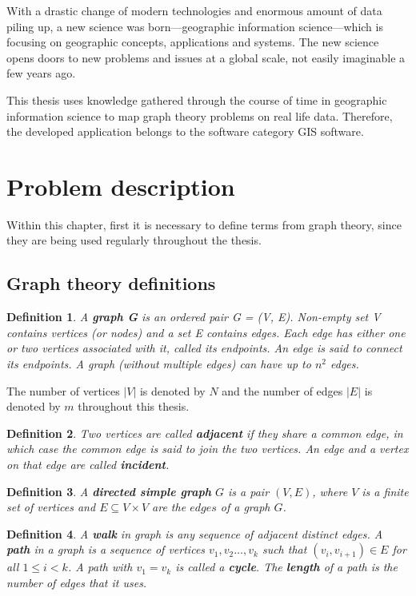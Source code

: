 \documentclass[thesis=M,english]{FITthesis}[2012/10/20]
\newtheorem{defin}{Definition}
\begin{document}
With a drastic change of modern technologies and enormous amount of data piling up, a new science was born---geographic information science---which is focusing on geographic concepts, applications and systems. The new science opens doors to new problems and issues at a global scale, not easily imaginable a few years ago. 

This thesis uses knowledge gathered through the course of time in geographic information science to map graph theory problems on real life data. Therefore, the developed application belongs to the software category GIS software. 


\section{Problem description}
Within this chapter, first it is necessary to define terms from graph theory, since they are being used regularly throughout the thesis. 
\subsection{Graph theory definitions}

\begin{defin}
A \textbf{graph G} is an ordered pair G = (V, E). Non-empty set V contains
vertices (or nodes) and a set E contains edges. Each edge has either one
or two vertices associated with it, called its endpoints. An edge is said to connect its endpoints.
A graph (without multiple edges) can have up to $n^2$ edges.
\end{defin}

The number of vertices $|V|$ is denoted by $N$ and the number of edges $|E|$ is denoted by $m$ throughout this thesis. 

\begin{defin}
Two vertices are called \textbf{adjacent} if they share a common edge, in which case the common edge is said to join the two vertices. An edge and a vertex on that edge are called \textbf{incident}.
\end{defin}

\begin{defin}
A \textbf{directed simple \textit{graph}} $G$ is a pair $(V, E)$, where $V$ is a finite set of \textit{vertices} and $E \subseteq V \times V$ are the $edges$ of a graph $G$. 
\end{defin}

\begin{defin}
A \textbf{walk} in graph is any sequence of adjacent distinct edges. A \textbf{path} in a graph is a sequence of vertices $v_1, v_2 \dots ,v_k$ such that $(v_i,v_{i+1}) \in E$ for all $1 \leq i < k$.  A path with $v_1 = v_k$ is called a \textbf{cycle}.  The \textbf{length} of a path is the number of edges that it uses.
\end{defin}
\end{document}
